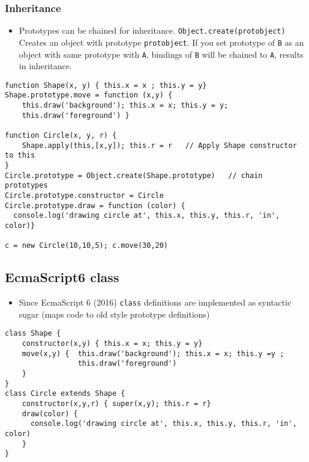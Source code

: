 \documentclass[trans,compress,xcolor=table]{beamer}
\begin{document}
\begin{frame}[fragile]
\frametitle{Inheritance}
\begin{itemize}
\item Prototypes can be chained for inheritance. \lstinline!Object.create(protobject)!
Creates an object with prototype \lstinline!protobject!. If you set prototype of
\lstinline!B! as an object with same prototype with \lstinline!A!, bindings of \lstinline!B! will be chained to \lstinline!A!, results in inheritance.
\end{itemize}
\begin{lstlisting}
function Shape(x, y) { this.x = x ; this.y = y} 
Shape.prototype.move = function (x,y) { 
	this.draw('background'); this.x = x; this.y = y;
	this.draw('foreground') }

function Circle(x, y, r) { 
	Shape.apply(this,[x,y]); this.r = r   // Apply Shape constructor to this
}
Circle.prototype = Object.create(Shape.prototype)	// chain prototypes
Circle.prototype.constructor = Circle
Circle.prototype.draw = function (color) {
  console.log('drawing circle at', this.x, this.y, this.r, 'in', color)}

c = new Circle(10,10,5); c.move(30,20)
\end{lstlisting}
\end{frame}

\subsection*{EcmaScript6 class}
\begin{frame}[fragile]
\begin{itemize}
\item Since EcmaScript 6 (2016) \lstinline!class! definitions are implemented as
syntactic sugar (maps code to old style prototype definitions)
\end{itemize}
\begin{lstlisting}
class Shape {
	constructor(x,y) { this.x = x; this.y = y}
    move(x,y) {  this.draw('background'); this.x = x; this.y =y ; 
				 this.draw('foreground')
	}
}
class Circle extends Shape {
	constructor(x,y,r) { super(x,y); this.r = r}
	draw(color) { 
	  console.log('drawing circle at', this.x, this.y, this.r, 'in', color)
	}
}
\end{lstlisting}
\end{frame}
\end{document}
